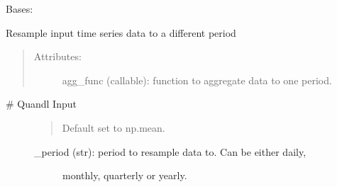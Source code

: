 \documentclass[letterpaper,10pt,english]{sphinxmanual}
\begin{document}
\begin{fulllineitems}
\label{\detokenize{dalio.pipe:dalio.pipe.col_generation.Period}}
Bases: {\hyperref[\detokenize{beginners-guide:dalio.pipe.col_generation._ColGeneration}]{}}

Resample input time series data to a different period
\begin{quote}
\begin{description}
\item[{Attributes:}] \leavevmode
agg\_func (callable): function to aggregate data to one period.

\end{description}
\end{quote}
\begin{description}
\item[{\# Quandl Input}] \leavevmode\begin{quote}

Default set to np.mean.
\end{quote}
\begin{description}
\item[{\_period (str): period to resample data to. Can be either daily,}] \leavevmode
monthly, quarterly or yearly.

\end{description}

\end{description}

\begin{fulllineitems}
\label{\detokenize{dalio.pipe:dalio.pipe.col_generation.Period.agg_func}}
\end{fulllineitems}



\end{fulllineitems}
\end{document}
